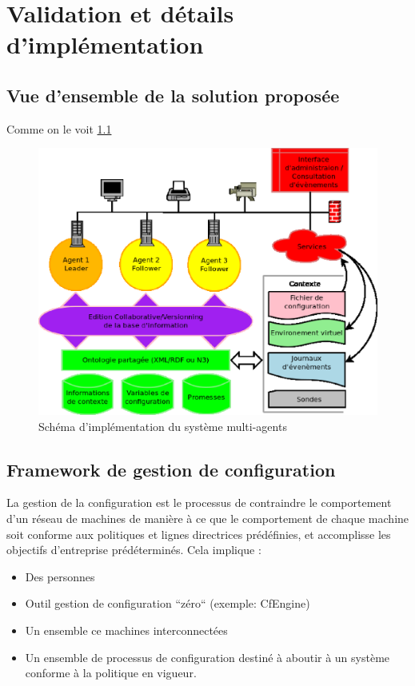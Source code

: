 \chapter{Validation et détails d'implémentation}

\section{Vue d'ensemble de la solution proposée}

Comme on le voit \ref{archi}

\begin{figure}
    \centering
    \includegraphics[width=.67\textwidth]{img/archi}
    \caption{Schéma d'implémentation du système multi-agents}
    \label{archi}
\end{figure}

\section{Framework de gestion de configuration}

La gestion de la configuration est le processus de contraindre le comportement
d'un réseau de machines de manière à ce que le comportement de chaque machine
soit conforme aux politiques et lignes directrices prédéfinies, et
accomplisse les objectifs d'entreprise prédéterminés. Cela implique :

\begin{itemize}
  \item Des personnes
  \item Outil gestion de configuration ``zéro`` (exemple: CfEngine)
  \item Un ensemble ce machines interconnectées
  \item Un ensemble de processus de configuration destiné à aboutir à un système
	  conforme à la politique en vigueur.
\end{itemize}

